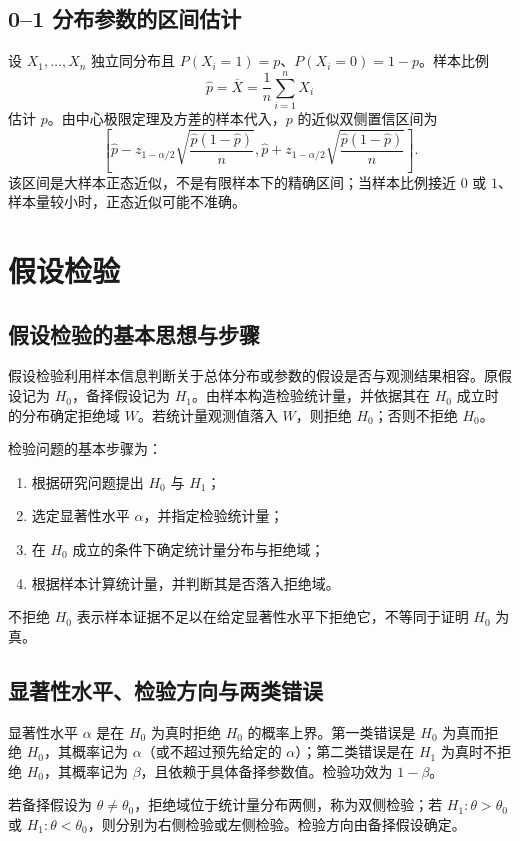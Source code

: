 \documentclass[11pt,a4paper,fontset=fandol]{ctexart}
\theoremstyle{remark}
\begin{document}
\subsection{0--1 分布参数的区间估计}
设 $X_1,\ldots,X_n$ 独立同分布且 $P(X_i=1)=p$、$P(X_i=0)=1-p$。样本比例
\[
    \widehat p=\overline X=\frac1n\sum_{i=1}^{n}X_i
\]
估计 $p$。由中心极限定理及方差的样本代入，$p$ 的近似双侧置信区间为
\[
    \left[
        \widehat p-z_{1-\alpha/2}
        \sqrt{\frac{\widehat p(1-\widehat p)}{n}},
        \widehat p+z_{1-\alpha/2}
        \sqrt{\frac{\widehat p(1-\widehat p)}{n}}
    \right].
\]
该区间是大样本正态近似，不是有限样本下的精确区间；当样本比例接近 $0$ 或 $1$、样本量较小时，正态近似可能不准确。

\clearpage
\section{假设检验}
\subsection{假设检验的基本思想与步骤}
假设检验利用样本信息判断关于总体分布或参数的假设是否与观测结果相容。原假设记为 $H_0$，备择假设记为 $H_1$。由样本构造检验统计量，并依据其在 $H_0$ 成立时的分布确定拒绝域 $W$。若统计量观测值落入 $W$，则拒绝 $H_0$；否则不拒绝 $H_0$。

检验问题的基本步骤为：
\begin{enumerate}
    \item 根据研究问题提出 $H_0$ 与 $H_1$；
    \item 选定显著性水平 $\alpha$，并指定检验统计量；
    \item 在 $H_0$ 成立的条件下确定统计量分布与拒绝域；
    \item 根据样本计算统计量，并判断其是否落入拒绝域。
\end{enumerate}
不拒绝 $H_0$ 表示样本证据不足以在给定显著性水平下拒绝它，不等同于证明 $H_0$ 为真。

\subsection{显著性水平、检验方向与两类错误}
显著性水平 $\alpha$ 是在 $H_0$ 为真时拒绝 $H_0$ 的概率上界。第一类错误是 $H_0$ 为真而拒绝 $H_0$，其概率记为 $\alpha$（或不超过预先给定的 $\alpha$）；第二类错误是在 $H_1$ 为真时不拒绝 $H_0$，其概率记为 $\beta$，且依赖于具体备择参数值。检验功效为 $1-\beta$。

若备择假设为 $\theta\ne\theta_0$，拒绝域位于统计量分布两侧，称为双侧检验；若 $H_1:\theta>\theta_0$ 或 $H_1:\theta<\theta_0$，则分别为右侧检验或左侧检验。检验方向由备择假设确定。
\end{document}
